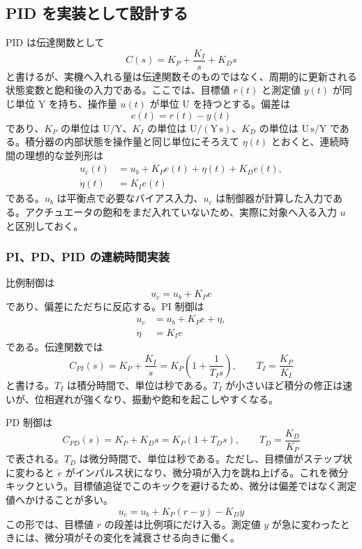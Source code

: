 \subsection{PID を実装として設計する}

PID は伝達関数として
\begin{equation}
  C(s)=K_P+\frac{K_I}{s}+K_Ds
\end{equation}
と書けるが、実機へ入れる量は伝達関数そのものではなく、周期的に更新される状態変数と飽和後の入力である。ここでは、目標値 $r(t)$ と測定値 $y(t)$ が同じ単位 $\mathrm{Y}$ を持ち、操作量 $u(t)$ が単位 $\mathrm{U}$ を持つとする。偏差は
\begin{equation}
  e(t)=r(t)-y(t)
\end{equation}
であり、$K_P$ の単位は $\mathrm{U}/\mathrm{Y}$、$K_I$ の単位は $\mathrm{U}/(\mathrm{Y}\,\mathrm{s})$、$K_D$ の単位は $\mathrm{U}\,\mathrm{s}/\mathrm{Y}$ である。積分器の内部状態を操作量と同じ単位にそろえて $\eta(t)$ とおくと、連続時間の理想的な並列形は
\begin{align}
  u_c(t)&=u_b+K_Pe(t)+\eta(t)+K_D\dot{e}(t),\\
  \dot{\eta}(t)&=K_Ie(t)
  \label{eq:pid-continuous-ideal}
\end{align}
である。$u_b$ は平衡点で必要なバイアス入力、$u_c$ は制御器が計算した入力である。アクチュエータの飽和をまだ入れていないため、実際に対象へ入る入力 $u$ と区別しておく。

\subsubsection{PI、PD、PID の連続時間実装}

比例制御は
\begin{equation}
  u_c=u_b+K_Pe
\end{equation}
であり、偏差にただちに反応する。PI 制御は
\begin{align}
  u_c&=u_b+K_Pe+\eta,\\
  \dot{\eta}&=K_Ie
\end{align}
である。伝達関数では
\begin{equation}
  C_{PI}(s)=K_P+\frac{K_I}{s}
  =K_P\left(1+\frac{1}{T_Is}\right),
  \qquad
  T_I=\frac{K_P}{K_I}
\end{equation}
と書ける。$T_I$ は積分時間で、単位は秒である。$T_I$ が小さいほど積分の修正は速いが、位相遅れが強くなり、振動や飽和を起こしやすくなる。

PD 制御は
\begin{equation}
  C_{PD}(s)=K_P+K_Ds
  =K_P(1+T_Ds),
  \qquad
  T_D=\frac{K_D}{K_P}
\end{equation}
で表される。$T_D$ は微分時間で、単位は秒である。ただし、目標値がステップ状に変わると $\dot{e}$ がインパルス状になり、微分項が入力を跳ね上げる。これを微分キックという。目標値追従でこのキックを避けるため、微分は偏差ではなく測定値へかけることが多い。
\begin{equation}
  u_c=u_b+K_P(r-y)-K_D\dot{y}
\end{equation}
この形では、目標値 $r$ の段差は比例項にだけ入る。測定値 $y$ が急に変わったときには、微分項がその変化を減衰させる向きに働く。

